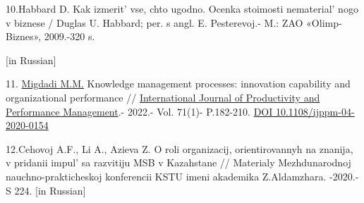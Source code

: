 \begin{references}
10.Habbard D. Kak izmerit'{} vse, chto ugodno. Ocenka
stoimosti nematerial' nogo v biznese / Duglas U. Habbard;
per. s angl. E. Pesterevoj.- M.: ZAO «Olimp-Biznes», 2009.-320 s.

{[}in Russian{]}

11.
\href{https://www.emerald.com/insight/search?q=Mahmoud\%20Mohammad\%20Migdadi}{Migdadi
M.M.} Knowledge management processes: innovation capability and
organizational performance //
\href{https://www.emerald.com/insight/publication/issn/1741-0401}{International
Journal of Productivity and Performance Management}.- 2022.- Vol. 71(1)-
P.182-210. \href{https://doi.org/10.1108/ijppm-04-2020-0154}{DOI
10.1108/ijppm-04-2020-0154}

12.Cehovoj A.F., Li A., Azieva Z. O roli organizacij, orientirovannyh na
znanija, v pridanii impul' sa razvitiju MSB v Kazahstane
// Materialy Mezhdunarodnoj nauchno-prakticheskoj konferencii KSTU imeni
akademika Z.Aldamzhara. -2020.- S 224. {[}in Russian{]}
\end{references}

